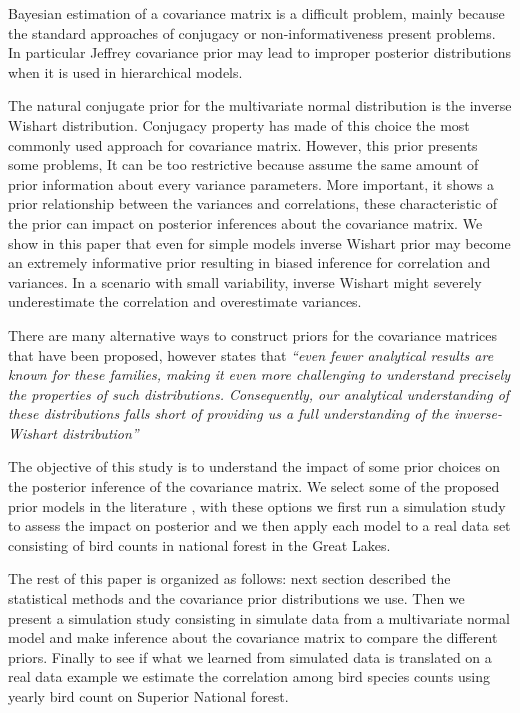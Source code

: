 \documentclass{article}
\begin{document}
Bayesian estimation of a covariance matrix is a difficult problem, mainly because the standard approaches of conjugacy or non-informativeness present problems. In particular Jeffrey covariance prior may lead to improper posterior distributions when it is used in hierarchical models.  

The natural conjugate prior for the multivariate normal distribution is the inverse Wishart distribution. Conjugacy property has made of this choice the most commonly used approach for covariance matrix. However, this prior presents some problems, It can be too restrictive because assume the same amount of prior information about every variance parameters. More important, it shows a prior relationship between the variances and correlations, these characteristic of the prior can impact on posterior inferences about the covariance matrix. We show in this paper that even for simple models inverse Wishart prior may become an extremely informative prior resulting in biased inference for correlation and variances. In a scenario with small variability, inverse Wishart might severely underestimate the correlation and overestimate variances. 

There are many alternative ways to construct priors for the covariance matrices that have been proposed,  however \cite{visualize} states that 
 \textit{``even fewer analytical results are known for these families, making it even more challenging to understand precisely the properties of such distributions. Consequently, our analytical understanding of these distributions falls short of providing us a full understanding of the inverse-Wishart distribution'' }
 
The objective of this study is to understand the impact of some prior choices on the posterior inference of the covariance matrix. We select some of the proposed prior models in the literature , with these options we first run a simulation study to assess the impact on posterior and we then apply each model  to a real data set consisting of bird counts in national forest in the Great Lakes. 

The rest of this paper is organized as follows: next section described the statistical methods and the covariance prior distributions we use. Then we present a simulation study consisting in simulate data from a multivariate normal model and make inference about the covariance matrix to compare the different priors. Finally to see if what we learned from simulated data is translated on a real data example we estimate the correlation among bird species counts using yearly bird count on Superior National forest. 
\end{document}
